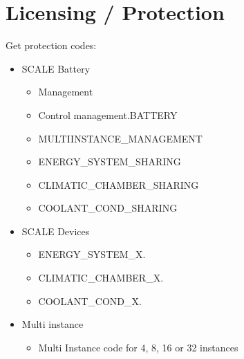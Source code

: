 \documentclass[letterpaper,10pt,english]{jupyterBook}
\begin{document}
\section{Licensing / Protection}
\label{\detokenize{03_First-Installation:licensing-protection}}
\sphinxAtStartPar
Get protection codes:
\begin{itemize}
\item {} 
\sphinxAtStartPar
SCALE Battery
\begin{itemize}
\item {} 
\sphinxAtStartPar
Management

\item {} 
\sphinxAtStartPar
Control management.BATTERY

\item {} 
\sphinxAtStartPar
MULTIINSTANCE\_MANAGEMENT

\item {} 
\sphinxAtStartPar
ENERGY\_SYSTEM\_SHARING

\item {} 
\sphinxAtStartPar
CLIMATIC\_CHAMBER\_SHARING

\item {} 
\sphinxAtStartPar
COOLANT\_COND\_SHARING

\end{itemize}

\item {} 
\sphinxAtStartPar
SCALE Devices
\begin{itemize}
\item {} 
\sphinxAtStartPar
ENERGY\_SYSTEM\_X.

\item {} 
\sphinxAtStartPar
CLIMATIC\_CHAMBER\_X.

\item {} 
\sphinxAtStartPar
COOLANT\_COND\_X.

\end{itemize}

\item {} 
\sphinxAtStartPar
Multi instance
\begin{itemize}
\item {} 
\sphinxAtStartPar
Multi Instance code for 4, 8, 16 or 32 instances

\end{itemize}

\end{itemize}
\end{document}

